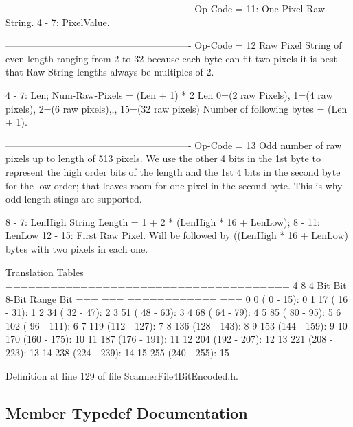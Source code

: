 \begin{DoxyCode}
----------------------------------------------------------
 Op-Code = 11:   One Pixel Raw String. 
  4 -  7:     PixelValue.


----------------------------------------------------------
 Op-Code = 12   Raw Pixel String of even length ranging from 2 to 32 
                because each byte can fit two pixels it is best that Raw String lengths
                always be multiples of 2.

  4 -  7:     Len;   Num-Raw-Pixels = (Len + 1) * 2
              Len  0=(2 raw Pixels), 1=(4 raw pixels), 2=(6 raw pixels),,, 15=(32 raw pixels)
              Number of following bytes = (Len + 1).


----------------------------------------------------------
 Op-Code = 13  Odd number of raw pixels up to length of 513 pixels.
               We use the other 4 bits in the 1st byte to represent the high order bits of the length
               and the 1st 4 bits in the second byte \textcolor{keywordflow}{for} the low order;  that leaves room \textcolor{keywordflow}{for} one 
               pixel in the second byte.  This is why odd length stings are supported.

   8 -  7:  LenHigh             String Length = 1 + 2 * (LenHigh * 16 + LenLow);
   8 - 11:  LenLow
  12 - 15:  First Raw Pixel.    Will be followed by ((LenHigh * 16 + LenLow) bytes with two pixels 
                                in each one.

           Translation Tables
  ======================================
  4     8                              4
  Bit   Bit           8-Bit  Range   Bit 
  ===   ===           ============   ===
  0       0           (  0 -  15):     0
  1      17           ( 16 -  31):     1
  2      34           ( 32 -  47):     2
  3      51           ( 48 -  63):     3
  4      68           ( 64 -  79):     4
  5      85           ( 80 -  95):     5
  6     102           ( 96 - 111):     6
  7     119           (112 - 127):     7
  8     136           (128 - 143):     8
  9     153           (144 - 159):     9
  10    170           (160 - 175):    10
  11    187           (176 - 191):    11
  12    204           (192 - 207):    12
  13    221           (208 - 223):    13
  14    238           (224 - 239):    14
  15    255           (240 - 255):    15
\end{DoxyCode}
 

Definition at line 129 of file Scanner\+File4\+Bit\+Encoded.\+h.



\subsection{Member Typedef Documentation}
